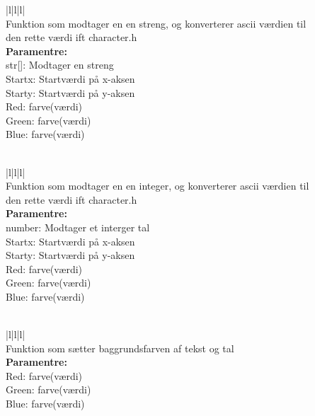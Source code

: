 \begin{center}
\begin{tabular}{ |l|l|l| }
\hline
{} \\
\hline
Funktion som modtager en en streng, og konverterer ascii værdien til \\den rette værdi ift character.h \\
\hline
\textbf{Paramentre:}  \\str[]: Modtager en streng\\  Startx: Startværdi på x-aksen \\Starty: Startværdi på y-aksen\\ Red: farve(værdi)\\ Green: farve(værdi) \\ Blue: farve(værdi)\\
\\

\hline
\end{tabular}
\end{center}  

\begin{center}
\begin{tabular}{ |l|l|l| }
\hline
{} \\
\hline
Funktion som modtager en en integer, og konverterer ascii værdien til \\den rette værdi ift character.h \\
\hline
\textbf{Paramentre:}  \\number: Modtager et interger tal\\  Startx: Startværdi på x-aksen \\Starty: Startværdi på y-aksen\\ Red: farve(værdi)\\ Green: farve(værdi) \\ Blue: farve(værdi)\\
\\

\hline
\end{tabular}
\end{center}  

\begin{center}
\begin{tabular}{ |l|l|l| }
\hline
{} \\
\hline
Funktion som sætter baggrundsfarven af tekst og tal\\
\hline
\textbf{Paramentre:}  \\ Red: farve(værdi)\\ Green: farve(værdi) \\ Blue: farve(værdi)\\
\\

\hline
\end{tabular}
\end{center}  


